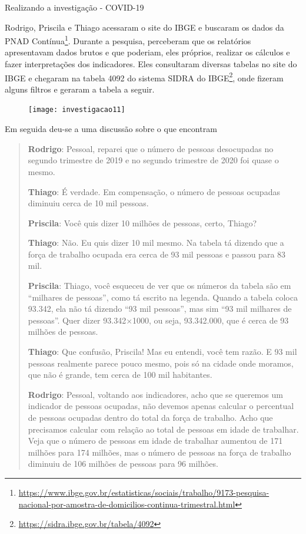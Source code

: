 \begin{example}{Realizando a investigação - COVID-19}

Rodrigo, Priscila e Thiago acessaram o site do IBGE e buscaram os dados da PNAD Contínua\footnote{\url{https://www.ibge.gov.br/estatisticas/sociais/trabalho/9173-pesquisa-nacional-por-amostra-de-domicilios-continua-trimestral.html}}. Durante a pesquisa, perceberam que os relatórios apresentavam dados brutos e que poderiam, eles próprios, realizar os cálculos e fazer interpretações dos indicadores. Eles consultaram diversas tabelas no site do IBGE e chegaram na tabela 4092 do sistema SIDRA do IBGE\footnote{\url{https://sidra.ibge.gov.br/tabela/4092}}, onde fizeram alguns filtros e geraram a tabela a seguir.

\begin{figure}[H]
\centering

\texttt{[image: investigacao11]}
\end{figure}

Em seguida deu-se a uma discussão sobre o que encontram
\begin{quote}
\textbf{Rodrigo}: Pessoal, reparei que o número de pessoas desocupadas no segundo trimestre de 2019 e no segundo trimestre de 2020 foi quase o mesmo.

\textbf{Thiago}: É verdade. Em compensação, o número de pessoas ocupadas diminuiu cerca de 10 mil pessoas.

\textbf{Priscila}: Você quis dizer 10 milhões de pessoas, certo, Thiago?

\textbf{Thiago}: Não. Eu quis dizer 10 mil mesmo. Na tabela tá dizendo que a força de trabalho ocupada era cerca de 93 mil pessoas e passou para 83 mil.

\textbf{Priscila}: Thiago, você esqueceu de ver que os números da tabela são em “milhares de pessoas”, como tá escrito na legenda. Quando a tabela coloca 93.342, ela não tá dizendo “93 mil pessoas”, mas sim “93 mil milhares de pessoas”. Quer dizer 93.342$\times$1000, ou seja, 93.342.000, que é cerca de 93 milhões de pessoas.

\textbf{Thiago}: Que confusão, Priscila! Mas eu entendi, você tem razão. E 93 mil pessoas realmente parece pouco mesmo, pois só na cidade onde moramos, que não é grande, tem cerca de 100 mil habitantes.

\textbf{Rodrigo}: Pessoal, voltando aos indicadores, acho que se queremos um indicador de pessoas ocupadas, não devemos apenas calcular o percentual de pessoas ocupadas dentro do total da força de trabalho. Acho que precisamos calcular com relação ao total de pessoas em idade de trabalhar. Veja que o número de pessoas em idade de trabalhar aumentou de 171 milhões para 174 milhões, mas o número de pessoas na força de trabalho diminuiu de 106 milhões de pessoas para 96 milhões.


\end{quote}
\end{example}
